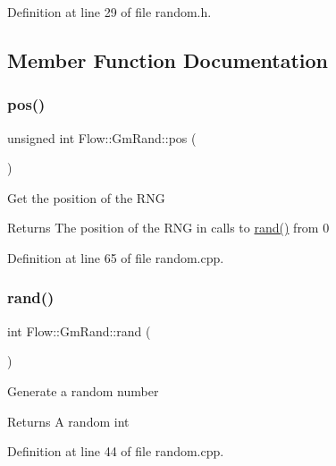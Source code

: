 Definition at line 29 of file random.\+h.



\subsection{Member Function Documentation}
\hypertarget{class_flow_1_1_gm_rand_aef1a411df95f3d49a7180fbcd9d432c1}{}\label{class_flow_1_1_gm_rand_aef1a411df95f3d49a7180fbcd9d432c1} 
\subsubsection{\texorpdfstring{pos()}{pos()}}
{\footnotesize\ttfamily unsigned int Flow\+::\+Gm\+Rand\+::pos (\begin{DoxyParamCaption}{ }\end{DoxyParamCaption})}

Get the position of the R\+NG \begin{DoxyReturn}{Returns}
The position of the R\+NG in calls to \hyperlink{class_flow_1_1_gm_rand_a638c37993080f31a9857d11c284c15b5}{rand()} from 0 
\end{DoxyReturn}


Definition at line 65 of file random.\+cpp.

\hypertarget{class_flow_1_1_gm_rand_a638c37993080f31a9857d11c284c15b5}{}\label{class_flow_1_1_gm_rand_a638c37993080f31a9857d11c284c15b5} 
\subsubsection{\texorpdfstring{rand()}{rand()}}
{\footnotesize\ttfamily int Flow\+::\+Gm\+Rand\+::rand (\begin{DoxyParamCaption}{ }\end{DoxyParamCaption})}

Generate a random number \begin{DoxyReturn}{Returns}
A random int 
\end{DoxyReturn}


Definition at line 44 of file random.\+cpp.

\hypertarget{class_flow_1_1_gm_rand_aeb38e9d08aae7a5d4788facf408b01dc}{}\label{class_flow_1_1_gm_rand_aeb38e9d08aae7a5d4788facf408b01dc} 
